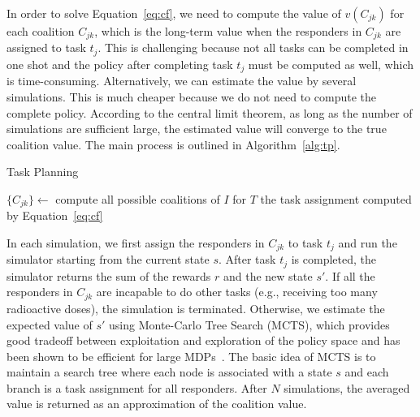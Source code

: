 In order to solve Equation~\ref{eq:cf}, we need to compute the
value of $v(C_{jk})$ for each coalition $C_{jk}$, which is the
long-term value when the responders in $C_{jk}$ are assigned to
task $t_j$. This is challenging because not all tasks can be
completed in one shot and the policy after completing task $t_j$
must be computed as well, which is time-consuming. Alternatively,
we can estimate the value by several simulations. This is much
cheaper because we do not need to compute the complete policy.
According to the central limit theorem, as long as the number of
simulations are sufficient large, the estimated value will converge
to the true coalition value. The main process is outlined in
Algorithm~\ref{alg:tp}.

\begin{algorithm}[t]
  \caption{Task Planning}
  $\{ C_{jk} \} \gets$ compute all possible coalitions of $I$ for
  $T$ \;
  \Return the task assignment computed by Equation~\ref{eq:cf}
  \label{alg:tp}
\end{algorithm}

In each simulation, we first assign the responders in $C_{jk}$ to
task $t_j$ and run the simulator starting from the current state
$s$. After task $t_j$ is completed, the simulator returns the sum
of the rewards $r$ and the new state $s'$. If all the responders in
$C_{jk}$ are incapable to do other tasks (e.g., receiving too many
radioactive doses), the simulation is terminated. Otherwise, we
estimate the expected value of $s'$ using Monte-Carlo Tree Search
(MCTS), which provides good tradeoff between exploitation and
exploration of the policy space and has been shown to be efficient
for large MDPs~\cite{?}. The basic idea of MCTS is to maintain a
search tree where each node is associated with a state $s$ and each
branch is a task assignment for all responders. After $N$
simulations, the averaged value is returned as an approximation of
the coalition value.

